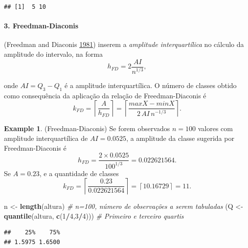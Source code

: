 \documentclass[
]{book}
\newenvironment{Shaded}{\begin{snugshade}}{\end{snugshade}}
\newcommand{\CommentTok}[1]{\textcolor[rgb]{0.56,0.35,0.01}{\textit{#1}}}
\newcommand{\DecValTok}[1]{\textcolor[rgb]{0.00,0.00,0.81}{#1}}
\newcommand{\KeywordTok}[1]{\textcolor[rgb]{0.13,0.29,0.53}{\textbf{#1}}}
\newcommand{\NormalTok}[1]{#1}
\newcommand{\OperatorTok}[1]{\textcolor[rgb]{0.81,0.36,0.00}{\textbf{#1}}}
\newcommand{\StringTok}[1]{\textcolor[rgb]{0.31,0.60,0.02}{#1}}
\theoremstyle{definition}
\theoremstyle{definition}
\newtheorem{example}{Example}[chapter]
\theoremstyle{definition}
\theoremstyle{remark}
\begin{document}
\begin{verbatim}
## [1]  5 10
\end{verbatim}

\hypertarget{freedman-diaconis}{%
\paragraph*{3. Freedman-Diaconis}\label{freedman-diaconis}}

(Freedman and Diaconis \protect\hyperlink{ref-freedman1981histogram}{1981}) inserem a \emph{amplitude interquartílica} no cálculo da amplitude do intervalo, na forma
\begin{equation}
h_{FD} = 2 \dfrac{AI}{n^{1/3}},
\label{eq:h-fd}
\end{equation}

onde \(AI = Q_{3} - Q_{1}\) é a amplitude interquartílica. O número de classes obtido como consequência da aplicação da relação de Freedman-Diaconis é
\begin{equation}
k_{FD} = \left\lceil \dfrac{A}{h_{FD}} \right\rceil = \left\lceil \dfrac{max{X} - min{X}}{2 \, AI \, n^{-1/3}} \right\rceil.
\label{eq:k-fd}
\end{equation}

\begin{example}
\protect\hypertarget{exm:fd}{}{\label{exm:fd} }(Freedman-Diaconis) Se forem observados \(n=100\) valores com amplitude interquartílica de \(AI=0.0525\), a amplitude da classe sugerida por Freedman-Diaconis é \[h_{FD} = \dfrac{2 \times 0.0525}{100^{1/3}} = 0.022621564.\] Se \(A=0.23\), e a quantidade de classes \[k_{FD} = \left\lceil \dfrac{0.23}{0.022621564} \right\rceil = \left\lceil 10.16729 \right\rceil = 11.\]
\end{example}

\begin{Shaded}
\begin{Highlighting}[]
\NormalTok{n \textless{}{-}}\StringTok{ }\KeywordTok{length}\NormalTok{(altura)                   }\CommentTok{\# n=100, número de observações a serem tabuladas}
\NormalTok{(Q \textless{}{-}}\StringTok{ }\KeywordTok{quantile}\NormalTok{(altura, }\KeywordTok{c}\NormalTok{(}\DecValTok{1}\OperatorTok{/}\DecValTok{4}\NormalTok{,}\DecValTok{3}\OperatorTok{/}\DecValTok{4}\NormalTok{)))   }\CommentTok{\# Primeiro e terceiro quartis}
\end{Highlighting}
\end{Shaded}

\begin{verbatim}
##    25%    75% 
## 1.5975 1.6500
\end{verbatim}
\end{document}
